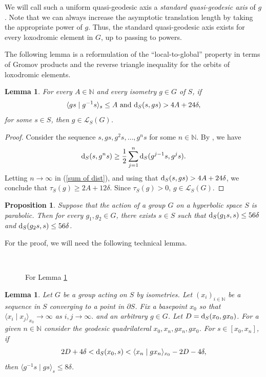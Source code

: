 \documentclass[11pt,letterpaper]{article}
\newcommand{\NN}{\mathbb{N}}
\renewcommand{\d}{{\rm d}}
\renewcommand{\d}{{\rm d}}
\newtheorem{lem}[thm]{Lemma}
\newtheorem{prop}[thm]{Proposition}
\theoremstyle{definition}
\theoremstyle{remark}
\begin{document}
We will call such a uniform quasi-geodesic axis a {\it standard quasi-geodesic axis} of $g$. Note that we can always increase the asymptotic translation length by taking the appropriate power of $g$. Thus, the standard quasi-geodesic axis exists for every loxodromic element in $G$, up to passing to powers.

The following lemma is a reformulation of the “local-to-global'' property in terms of Gromov products and the reverse triangle inequality for the orbits of loxodromic elements. 

\begin{lem}\label{loxodromic criterion}
For every $A \in \NN$ and every isometry $g \in G$ of $S$, if 
$$
\langle gs \mid g^{-1}s \rangle_s \leq A \text{ and } \d_S(s, gs) > 4A+24\delta,
$$
for some $s \in S$, then $g \in \mathcal{L}_S(G)$.
\end{lem}
\begin{proof}
    Consider the sequence $s, gs, g^2s, \dots, g^ns$ for some $n \in \NN$. By \cite[Lemma 2.1]{Spencer}, we have 
    \begin{equation}\label{sum of dist}
    \d_S(s, g^ns) \geq \frac{1}{2}\sum_{j=1}^n\d_S(g^{j-1}s, g^js).
    \end{equation}
    Letting $n \rightarrow \infty$ in (\ref{sum of dist}), and using that $\d_S(s, gs) > 4A+24\delta$, we conclude that 
    $\tau_S(g)\geq 2A+12\delta$. Since $\tau_S(g) > 0$, $g \in \mathcal{L}_S(G)$.
\end{proof}

\begin{prop}\label{elements of parabolic subgroups don't move some points far}
Suppose that the action of a group $G$ on a hyperbolic space $S$ is parabolic. Then for every $g_1, g_2 \in G$, there exists $s \in S$ such that $\d_S(g_1s, s) \leq 56\delta$ and $\d_S(g_2s,s) \leq 56\delta$.
\end{prop}

For the proof, we will need the following technical lemma. 

\begin{figure}
\centering\\
  \caption{For Lemma \ref{gromov product is bounded}}\label{sgp}
\end{figure}

\begin{lem}\label{gromov product is bounded}
Let $G$ be a group acting on $S$ by isometries. Let $(x_i)_{i\in \NN}$ be a sequence in $S$ converging to a point in $\partial S$. Fix a basepoint $x_0$ so that $\langle x_i \mid x_j \rangle_{x_0} \longrightarrow \infty$ as $i, j \longrightarrow \infty.$ and an arbitrary $g \in G$. Let $D=\d_S(x_0, gx_0)$. For a given $n \in \NN$ consider the geodesic quadrilateral $x_0, x_n, gx_n, gx_0$.
For $s \in [x_0, x_n]$, if 
\begin{equation}\label{Choice of s 2}
2D+4\delta < \d_S(x_0,s) <\langle x_n \mid  gx_n \rangle_{x_0} -2D -4\delta,
\end{equation}
then $\langle g^{-1}s \mid gs \rangle_s \leq 8\delta$.
\end{lem}
\end{document}
